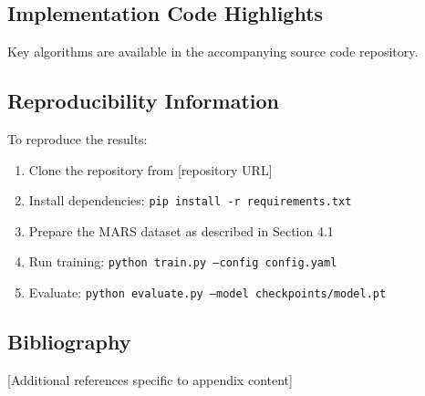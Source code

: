 \subsection{Implementation Code Highlights}

Key algorithms are available in the accompanying source code repository.

\subsection{Reproducibility Information}

To reproduce the results:

\begin{enumerate}
    \item Clone the repository from [repository URL]
    \item Install dependencies: \texttt{pip install -r requirements.txt}
    \item Prepare the MARS dataset as described in Section 4.1
    \item Run training: \texttt{python train.py --config config.yaml}
    \item Evaluate: \texttt{python evaluate.py --model checkpoints/model.pt}
\end{enumerate}

\subsection{Bibliography}

[Additional references specific to appendix content]

\newpage
